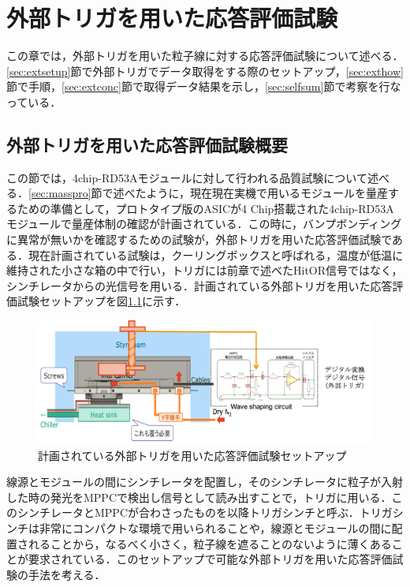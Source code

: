 \chapter{外部トリガを用いた応答評価試験}
この章では，外部トリガを用いた粒子線に対する応答評価試験について述べる．\ref{sec:extsetup}節で外部トリガでデータ取得をする際のセットアップ，\ref{sec:exthow}節で手順，\ref{sec:extconc}節で取得データ結果を示し，\ref{sec:selfsum}節で考察を行なっている．

\section{外部トリガを用いた応答評価試験概要}
この節では，4chip-RD53Aモジュールに対して行われる品質試験について述べる．\ref{sec:masspro}節で述べたように，現在現在実機で用いるモジュールを量産するための準備として，プロトタイプ版のASICが4 $\mathrm{Chip}$搭載された4chip-RD53Aモジュールで量産体制の確認が計画されている．この時に，バンプボンディングに異常が無いかを確認するための試験が，外部トリガを用いた応答評価試験である．現在計画されている試験は，クーリングボックスと呼ばれる，温度が低温に維持された小さな箱の中で行い，トリガには前章で述べたHitOR信号ではなく，シンチレータからの光信号を用いる．計画されている外部トリガを用いた応答評価試験セットアップを図\ref{fig:trigplan}に示す．

\begin{figure}[h]
  \centering
  \includegraphics[width=12cm]{./figure/trigplan.png}
  \caption{計画されている外部トリガを用いた応答評価試験セットアップ}
  \label{fig:trigplan}
\end{figure}


線源とモジュールの間にシンチレータを配置し，そのシンチレータに粒子が入射した時の発光をMPPCで検出し信号として読み出すことで，トリガに用いる．このシンチレータとMPPCが合わさったものを以降トリガシンチと呼ぶ．トリガシンチは非常にコンパクトな環境で用いられることや，線源とモジュールの間に配置されることから，なるべく小さく，粒子線を遮ることのないように薄くあることが要求されている．このセットアップで可能な外部トリガを用いた応答評価試験の手法を考える．

